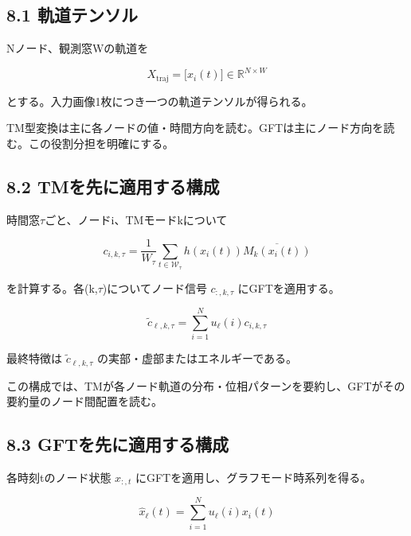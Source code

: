 \documentclass[11pt,a4paper]{ltjsarticle}
\begin{document}

\subsection*{\textcolor{researchblue}{8.1 軌道テンソル}}

Nノード、観測窓Wの軌道を\par

\[
X_{\mathrm{traj}}=\bigl[x_i(t)\bigr]\in\mathbb{R}^{N\times W}
\]

とする。入力画像1枚につき一つの軌道テンソルが得られる。\par

TM型変換は主に各ノードの値・時間方向を読む。GFTは主にノード方向を読む。この役割分担を明確にする。\par

\subsection*{\textcolor{researchblue}{8.2 TMを先に適用する構成}}

時間窓\(\tau\)ごと、ノードi、TMモードkについて\par

\[
c_{i,k,\tau}=\frac{1}{W_{\tau}}\sum_{t\in\mathcal{W}_{\tau}}h\!\left(x_i(t)\right)\overline{M_k\!\left(x_i(t)\right)}
\]

を計算する。各(k,\(\tau\))についてノード信号 \(c_{:,k,\tau}\) にGFTを適用する。\par

\[
\widetilde{c}_{\ell,k,\tau}=\sum_{i=1}^{N}u_{\ell}(i)c_{i,k,\tau}
\]

最終特徴は \(\widetilde{c}_{\ell,k,\tau}\) の実部・虚部またはエネルギーである。\par

この構成では、TMが各ノード軌道の分布・位相パターンを要約し、GFTがその要約量のノード間配置を読む。\par

\subsection*{\textcolor{researchblue}{8.3 GFTを先に適用する構成}}

各時刻tのノード状態 \(x_{:,t}\) にGFTを適用し、グラフモード時系列を得る。\par

\[
\widehat{x}_{\ell}(t)=\sum_{i=1}^{N}u_{\ell}(i)x_i(t)
\]
\end{document}
